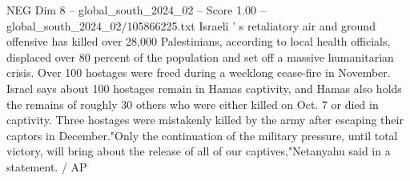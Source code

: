 \begin{textsample}{NEG Dim 8 – global\_south\_2024\_02 – Score 1.00 – global\_south\_2024\_02/105866225.txt}
Israeli ' s retaliatory air and ground offensive has killed over 28,000 Palestinians, according to local health officials, displaced over 80 percent of the population and set off a massive humanitarian crisis.
Over 100 hostages were freed during a weeklong cease-fire in November.
Israel says about 100 hostages remain in Hamas captivity, and Hamas also holds the remains of roughly 30 others who were either killed on Oct. 7 or died in captivity.
Three hostages were mistakenly killed by the army after escaping their captors in December."Only the continuation of the military pressure, until total victory, will bring about the release of all of our captives,"Netanyahu said in a statement. / AP

\end{textsample}
